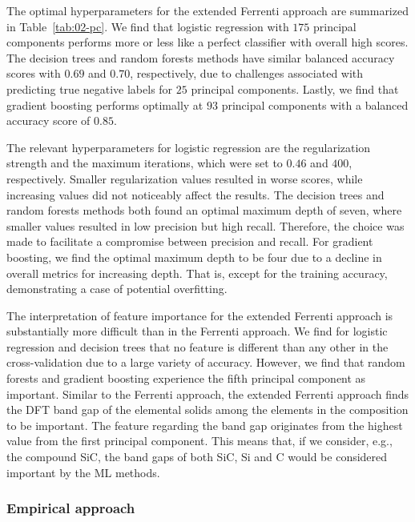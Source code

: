\documentclass[superscriptaddress,unsortedaddress,
 amsmath,amssymb,
 aps,
]{revtex4-2}
\begin{document}
The optimal hyperparameters for the extended Ferrenti approach are summarized in Table~\ref{tab:02-pc}. We find that logistic regression with $175$ principal components performs more or less like a perfect classifier with overall high scores. The decision trees and random forests methods have similar balanced accuracy scores with $0.69$ and $0.70$, respectively, due to challenges associated with predicting true negative labels for $25$ principal components. Lastly, we find that gradient boosting performs optimally at $93$ principal components with a balanced accuracy score of $0.85$. 

The relevant hyperparameters for logistic regression are the regularization strength and the maximum iterations, which were set to $0.46$ and $400$, respectively. Smaller regularization values resulted in worse scores, while increasing values did not noticeably affect the results. The decision trees and random forests methods both found an optimal maximum depth of seven, where smaller values resulted in low precision but high recall.  Therefore, the choice was made to facilitate a compromise between precision and recall. For gradient boosting, we find the optimal maximum depth to be four due to a decline in overall metrics for increasing depth.
That is, except for the training accuracy, demonstrating a case of potential overfitting.


The interpretation of feature importance for the extended Ferrenti approach is substantially more difficult than in the Ferrenti approach. We find for logistic regression and decision trees that no feature is different than any other in the cross-validation due to a large variety of accuracy. However, we find that random forests and gradient boosting experience the fifth principal component as important. 
Similar to the Ferrenti approach, the extended Ferrenti approach finds the DFT band gap of the elemental solids among the elements in the composition to be important. The feature regarding the band gap originates from the highest value from the first principal component. 
This means that, if we consider, e.g., the compound SiC, the band gaps of both SiC, Si and C would be considered important by the ML methods. 

\subsubsection*{Empirical approach}
\end{document}
